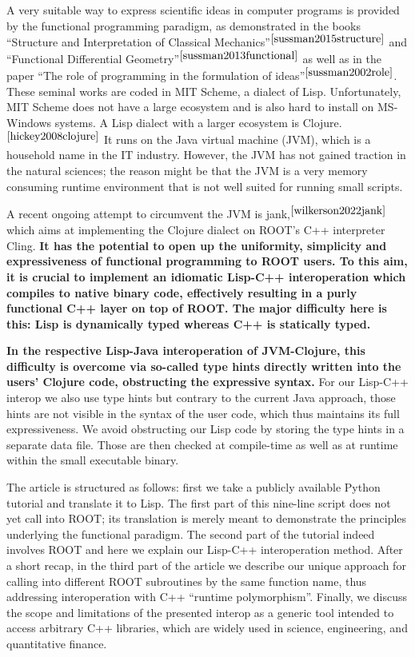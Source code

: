 \documentclass[twocolumn]{article}
\begin{document}
A very suitable way to express scientific ideas in computer programs is provided by the functional programming paradigm, as demonstrated in the books “Structure and Interpretation of Classical Mechanics”$^{\cite{sussman2015structure}}$ and “Functional Differential Geometry”$^{\cite{sussman2013functional}}$ as well as in the paper “The role of programming in the formulation of ideas”$^{\cite{sussman2002role}}$. These seminal works are coded in MIT Scheme, a dialect of Lisp. Unfortunately, MIT Scheme does not have a large ecosystem and is also hard to install on MS-Windows systems. A Lisp dialect with a larger ecosystem is Clojure.$^{\cite{hickey2008clojure}}$ It runs on the Java virtual machine (JVM), which is a household name in the IT industry. However, the JVM has not gained traction in the natural sciences; the reason might be that the JVM is a very memory consuming runtime environment that is not well suited for running small scripts.

A recent ongoing attempt to circumvent the JVM is jank,$^{\cite{wilkerson2022jank}}$ which aims at implementing the Clojure dialect on ROOT’s C++ interpreter Cling. \textbf{It has the potential to open up the uniformity, simplicity and expressiveness of functional programming to ROOT users. To this aim, it is crucial to implement an idiomatic Lisp-C++ interoperation which compiles to native binary code, effectively resulting in a purly functional C++ layer on top of ROOT. The major difficulty here is this: Lisp is dynamically typed whereas C++ is statically typed.}

\textbf{In the respective Lisp-Java interoperation of JVM-Clojure, this difficulty is overcome via so-called type hints directly written into the users’ Clojure code, obstructing the expressive syntax.} For our Lisp-C++ interop we also use type hints but contrary to the current Java approach, those hints are not visible in the syntax of the user code, which thus maintains its full expressiveness. We avoid obstructing our Lisp code by storing the type hints in a separate data file. Those are then checked at compile-time as well as at runtime within the small executable binary.

The article is structured as follows: first we take a publicly available Python tutorial and translate it to Lisp. The first part of this nine-line script does not yet call into ROOT; its translation is merely meant to demonstrate the principles underlying the functional paradigm. The second part of the tutorial indeed involves ROOT and here we explain our Lisp-C++ interoperation method. After a short recap, in the third part of the article we describe our unique approach for calling into different ROOT subroutines by the same function name, thus addressing interoperation with C++ “runtime polymorphism”. Finally, we discuss the scope and limitations of the presented interop as a generic tool intended to access arbitrary C++ libraries, which are widely used in science, engineering, and quantitative finance.
\end{document}

